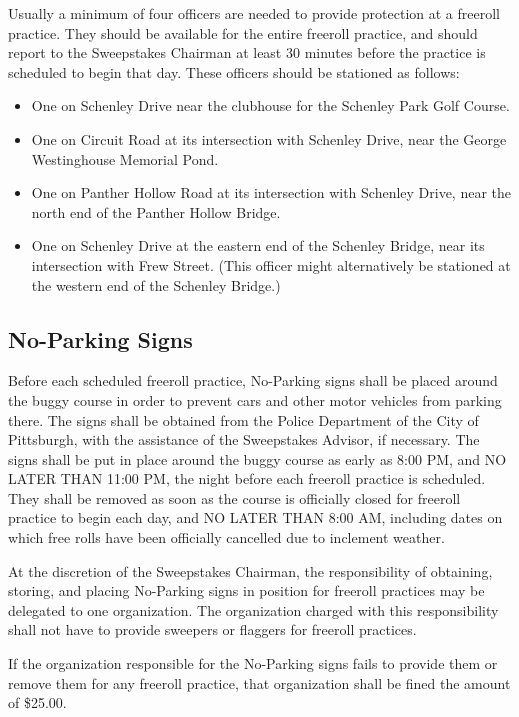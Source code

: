 \documentclass[openany]{book}
\begin{document}
Usually a minimum of four officers are needed to provide protection at a freeroll practice. They should be available for the entire freeroll practice, and should report to the Sweepstakes Chairman at least 30 minutes before the practice is scheduled to begin that day. These officers should be stationed as follows:
\begin{itemize}
	\item One on Schenley Drive near the clubhouse for the Schenley Park Golf Course.
	\item One on Circuit Road at its intersection with Schenley Drive, near the George Westinghouse Memorial Pond.
	\item One on Panther Hollow Road at its intersection with Schenley Drive, near the north end of the Panther Hollow Bridge.
	\item One on Schenley Drive at the eastern end of the Schenley Bridge, near its intersection with Frew Street. (This officer might alternatively be stationed at the western end of the Schenley Bridge.)
\end{itemize}

\subsection{No-Parking Signs}

Before each scheduled freeroll practice, No-Parking signs shall be placed around the buggy course in order to prevent cars and other motor vehicles from parking there. The signs shall be obtained from the Police Department of the City of Pittsburgh, with the assistance of the Sweepstakes Advisor, if necessary. The signs shall be put in place around the buggy course as early as 8:00 PM, and NO LATER THAN 11:00 PM, the night before each freeroll practice is scheduled. They shall be removed as soon as the course is officially closed for freeroll practice to begin each day, and NO LATER THAN 8:00 AM, including dates on which free rolls have been officially cancelled due to inclement weather.

At the discretion of the Sweepstakes Chairman, the responsibility of obtaining, storing, and placing No-Parking signs in position for freeroll practices may be delegated to one organization. The organization charged with this responsibility shall not have to provide sweepers or flaggers for freeroll practices.

If the organization responsible for the No-Parking signs fails to provide them or remove them for any freeroll practice, that organization shall be fined the amount of \$25.00.
\end{document}
